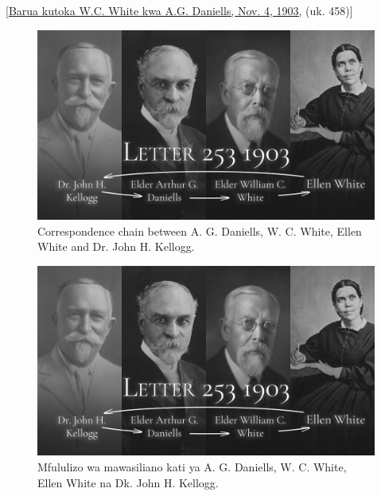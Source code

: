 [\href{https://ellenwhite.org/letterbooks/555}{Barua kutoka W.C. White kwa A.G. Daniells, Nov. 4, 1903,} (uk. 458)]

\begin{figure}[h]
    \centering
    \includegraphics[width=1\linewidth]{images/correspondance.jpg}
    \caption*{Correspondence chain between A. G. Daniells, W. C. White, Ellen White and Dr. John H. Kellogg.}
    \label{fig:corespondance}
\end{figure}

\begin{figure}[h]
    \centering
    \includegraphics[width=1\linewidth]{images/correspondance.jpg}
    \caption*{Mfululizo wa mawasiliano kati ya A. G. Daniells, W. C. White, Ellen White na Dk. John H. Kellogg.}
    \label{fig:corespondance}
\end{figure}

